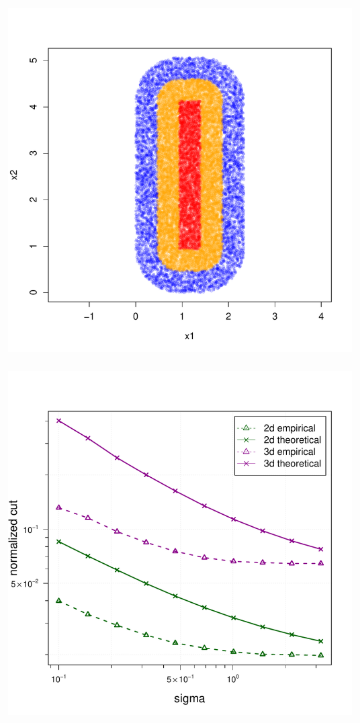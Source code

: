 \documentclass{article}
\newcommand{\1}{\mathbf{1}}
\theoremstyle{aldenthm}
\theoremstyle{aldenrmrk}
\begin{document}
\begin{figure}
\begin{adjustbox}{minipage=\linewidth,scale=0.8}
\begin{subfigure}{.33\linewidth}
		\includegraphics[width=\linewidth]{example1plots/sample1}
		\caption{}
	\end{subfigure}
	\begin{subfigure}{.33\linewidth}
		\includegraphics[width=\linewidth]{example1plots/sigma_normalized_cut_plot}
		\caption{}
	\end{subfigure}


\end{adjustbox}
\end{figure}
\end{document}
